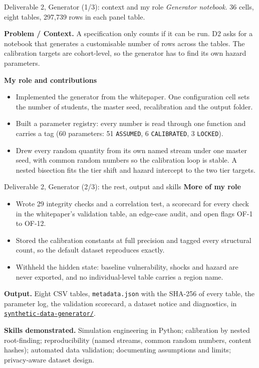 \documentclass[aspectratio=169,11pt,t]{beamer}
\newcommand{\ptag}[1]{\texttt{\small #1}}
\newcommand{\pfield}[1]{{\sffamily\bfseries\color{eskteal}#1}}
\newcommand{\repo}{https://github.com/machew-b/Student-Retention-Synthetic-Data-Generator}
\newcommand{\gh}[2]{\href{\repo/#1}{#2}}
\begin{document}
\begin{frame}{Deliverable 2, Generator (1/3): context and my role}
  \small
  {\itshape Generator notebook.} 36 cells, eight tables, 297,739 rows in each panel table.
  \medskip

  \pfield{Problem / Context.} A specification only counts if it can be run. D2 asks for a
  notebook that generates a customisable number of rows across the tables. The
  calibration targets are cohort-level, so the generator has to find its own hazard
  parameters.
  \medskip

  \pfield{My role and contributions}
  \begin{itemize}\setlength\itemsep{2pt}
    \item Implemented the generator from the whitepaper. One configuration cell sets
          the number of students, the master seed, recalibration and the output folder.
    \item Built a parameter registry: every number is read through one function and
          carries a tag (60 parameters: 51 \ptag{ASSUMED}, 6 \ptag{CALIBRATED}, 3 \ptag{LOCKED}).
    \item Drew every random quantity from its own named stream under one master seed,
          with common random numbers so the calibration loop is stable. A nested
          bisection fits the tier shift and hazard intercept to the two tier targets.
  \end{itemize}
\end{frame}

\begin{frame}{Deliverable 2, Generator (2/3): the rest, output and skills}
  \small
  \pfield{More of my role}
  \begin{itemize}\setlength\itemsep{2pt}
    \item Wrote 29 integrity checks and a correlation test, a scorecard for every check
          in the whitepaper's validation table, an edge-case audit, and open flags OF-1 to OF-12.
    \item Stored the calibration constants at full precision and tagged every structural
          count, so the default dataset reproduces exactly.
    \item Withheld the hidden state: baseline vulnerability, shocks and hazard are never
          exported, and no individual-level table carries a region name.
  \end{itemize}
  \medskip

  \pfield{Output.} Eight CSV tables, \texttt{metadata.json} with the SHA-256 of every
  table, the parameter log, the validation scorecard, a dataset notice and diagnostics,
  in \gh{tree/main/synthetic-data-generator}{\texttt{synthetic-data-generator/}}.
  \medskip

  \pfield{Skills demonstrated.} Simulation engineering in Python; calibration by nested
  root-finding; reproducibility (named streams, common random numbers, content hashes);
  automated data validation; documenting assumptions and limits; privacy-aware dataset design.
\end{frame}
\end{document}

